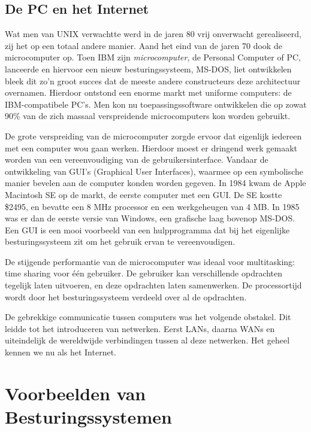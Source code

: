 \subsection{De PC en het Internet}

Wat men van UNIX verwachtte werd in de jaren 80 vrij onverwacht
gerealiseerd, zij het op een totaal andere manier. Aand het eind van
de jaren 70 dook de microcomputer op. Toen IBM zijn
\emph{microcomputer}, de Personal Computer of PC,
lanceerde en hiervoor een nieuw besturingssysteem, MS-DOS, liet
ontwikkelen bleek dit zo'n groot succes dat de meeste andere
constructeurs deze architectuur overnamen. Hierdoor ontstond een
enorme markt met uniforme computers: de IBM-compatibele PC's. Men kon
nu toepassingssoftware ontwikkelen die op zowat 90\% van de zich
massaal verspreidende microcomputers kon worden gebruikt.

De grote verspreiding van de microcomputer zorgde ervoor dat
eigenlijk iedereen met een computer wou gaan werken. Hierdoor moest er
dringend werk gemaakt worden van een vereenvoudiging van de
gebruikersinterface. Vandaar de ontwikkeling van GUI's (Graphical User
Interfaces), waarmee op een symbolische manier bevelen aan de computer
konden worden gegeven. In 1984 kwam de Apple Macintosh SE op de markt,
de eerste computer met een GUI. De SE kostte \$2495, en bevatte een 8
MHz processor en een werkgeheugen van 4 MB. In 1985 was er dan de
eerste versie van Windows, een grafische laag bovenop MS-DOS. Een GUI
is een mooi voorbeeld van een hulpprogramma dat bij het eigenlijke
besturingssysteem zit om het gebruik ervan te vereenvoudigen.

De stijgende performantie van de microcomputer was ideaal voor
multitasking: time sharing voor \'e\'en gebruiker. De gebruiker kan
verschillende opdrachten tegelijk laten uitvoeren, en deze opdrachten
laten samenwerken. De processortijd wordt door het besturingssysteem
verdeeld over al de opdrachten.

De gebrekkige communicatie tussen computers was het volgende
obstakel. Dit leidde tot het introduceren van netwerken. Eerst LANs,
daarna WANs en uiteindelijk de wereldwijde verbindingen tussen al deze
netwerken. Het geheel kennen we nu als het Internet.

\section{Voorbeelden van Besturingssystemen}

